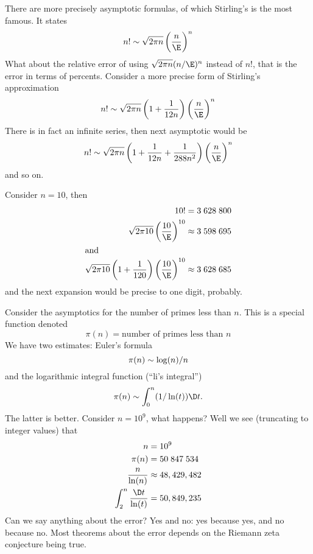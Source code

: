 There are more precisely asymptotic formulas, of which Stirling's
is the most famous. It states
\begin{equation}
n!\asymptote\sqrt{2\pi n}\left(\frac{n}{\E}\right)^{n}
\end{equation}
What about the relative error of using $\sqrt{2\pi n}(n/\E)^{n}$
instead of $n!$, that is the error in terms of percents. Consider
a more precise form of Stirling's approximation
\begin{equation}
n!\asymptote\sqrt{2\pi n}\left(1+\frac{1}{12n}\right)\left(\frac{n}{\E}\right)^{n}
\end{equation}
There is in fact an infinite series, then next asymptotic would be
\begin{equation}
n!\asymptote\sqrt{2\pi n}\left(1+\frac{1}{12n}+\frac{1}{288n^{2}}\right)\left(\frac{n}{\E}\right)^{n}
\end{equation}
and so on.

Consider $n=10$, then
\begin{subequations}
\begin{align}
10! &= 3\;628\;800\\
\sqrt{2\pi10}\left(\frac{10}{\E}\right)^{10} & \approx
3\;598\;695\\
\intertext{and}
\sqrt{2\pi10}\left(1+\frac{1}{120}\right)\left(\frac{10}{\E}\right)^{10} & \approx
3\;628\;685
\end{align}
\end{subequations}
and the next expansion would be precise to one digit, probably.

Consider the asymptotics for the number of primes less than
$n$. This is a special function denoted
\begin{equation}
\pi(n)=\mbox{number of primes less than $n$}
\end{equation}
We have two estimates: Euler's formula 
\begin{equation}
\pi(n)\sim\log(n)/n
\end{equation}
and the logarithmic integral function (``li's integral'') 
\begin{equation}
\pi(n)\asymptote\int^{n}_{0}(1/\ln(t))\D t. 
\end{equation}
The latter is better. Consider $n=10^{9}$, what happens? Well we
see (truncating to integer values) that
\begin{subequations}
\begin{align}
 n &= 10^{9}\\
\pi(n) &= 50\;847\;534\\
\frac{n}{\ln(n)} &\approx 48,429,482\\
\int^{n}_{2}\frac{\D t}{\ln(t)} &= 50,849,235
\end{align}
\end{subequations}
Can we say anything about the error? Yes and no: yes because yes,
and no because no. Most theorems about the error depends on the
Riemann zeta conjecture being true.

